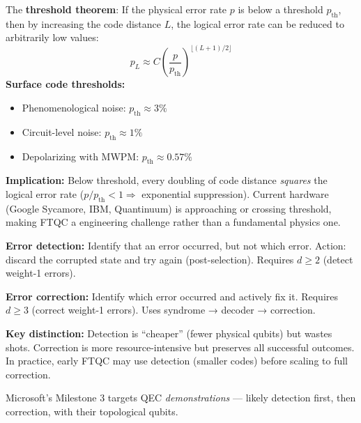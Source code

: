 \documentclass[11pt,a4paper]{article}
\begin{document}
\begin{answerbox}
The \textbf{threshold theorem}: If the physical error rate $p$ is below a threshold $p_{\text{th}}$, then by increasing the code distance $L$, the logical error rate can be reduced to arbitrarily low values:
\[
p_L \approx C \left(\frac{p}{p_{\text{th}}}\right)^{\lfloor(L+1)/2\rfloor}
\]
\textbf{Surface code thresholds:}
\begin{itemize}
    \item Phenomenological noise: $p_{\text{th}} \approx 3\%$
    \item Circuit-level noise: $p_{\text{th}} \approx 1\%$
    \item Depolarizing with MWPM: $p_{\text{th}} \approx 0.57\%$
\end{itemize}
\textbf{Implication:} Below threshold, every doubling of code distance \emph{squares} the logical error rate ($p/p_{\text{th}} < 1 \Rightarrow$ exponential suppression). Current hardware (Google Sycamore, IBM, Quantinuum) is approaching or crossing threshold, making FTQC a engineering challenge rather than a fundamental physics one.
\end{answerbox}

\begin{answerbox}
\textbf{Error detection:} Identify that an error occurred, but not which error. Action: discard the corrupted state and try again (post-selection). Requires $d \geq 2$ (detect weight-1 errors).

\textbf{Error correction:} Identify which error occurred and actively fix it. Requires $d \geq 3$ (correct weight-1 errors). Uses syndrome → decoder → correction.

\textbf{Key distinction:} Detection is ``cheaper'' (fewer physical qubits) but wastes shots. Correction is more resource-intensive but preserves all successful outcomes. In practice, early FTQC may use detection (smaller codes) before scaling to full correction.

Microsoft's Milestone 3 targets QEC \emph{demonstrations} --- likely detection first, then correction, with their topological qubits.
\end{answerbox}
\end{document}
